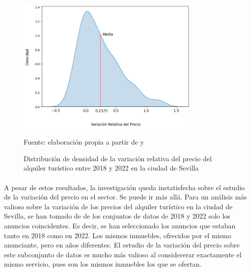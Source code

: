 \documentclass[a4paper,10pt]{article}
\begin{document}
            \begin{figure}
                \begin{flushright}
                    \includegraphics*[width = 9cm]{graphics/pricerelativevariation.png}
                    \begin{flushright}
                        \footnotesize{Fuente: elaboración propia a partir de \cite[(2)]{datahippo} y \cite[(1)]{insideairbnb}}
                    \end{flushright}
                    \caption{Distribución de densidad de la variación relativa del precio del alquiler turístico entre 2018 y 2022 en la ciudad de Sevilla}
                \end{flushright}
            \end{figure}

            \paragraph*{}
            A pesar de estos resultados, la investigación queda instatisfecha sobre el estudio de la variación del precio en el sector. Se 
            puede ir más allá.
            Para un análisis más valioso sobre la variación de los precios del alquiler turístico en la ciudad de Sevilla, se han tomado de 
            de los conjuntos de datos de 2018 y 2022 solo los anuncios coincidentes. Es decir, se han seleccionado los anuncios que estaban tanto
            en 2018 como en 2022. Los mismos inmuebles, ofrecidos por el mismo anunciante, pero en años diferentes. El estudio de la variación
            del precio sobre este subconjunto de datos es mucho más valioso al considererar exactamente el mismo servicio, pues son los mismos
            inmuebles los que se ofertan.

            \paragraph*{}
            \ \\
\end{document}
